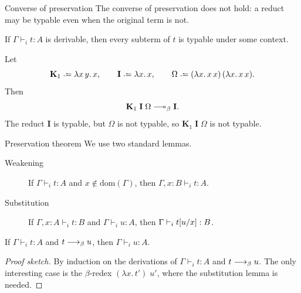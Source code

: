 \begin{frame}{Converse of preservation}
  The converse of preservation does not hold: a reduct may be typable even when
  the original term is not.

  \begin{lemma}
    If $\Gamma \vdash_i t : A$ is derivable, then every subterm of $t$ is
    typable under some context.
  \end{lemma}

  Let
  \[
    \mathbf{K}_1 \defeq \lambda x\,y.\,x,
    \qquad
    \mathbf{I} \defeq \lambda x.\,x,
    \qquad
    \Omega \defeq (\lambda x.\,x\,x)\,(\lambda x.\,x\,x).
  \]
  Then
  \[
    \mathbf{K}_1\;\mathbf{I}\;\Omega \reduce \mathbf{I}.
  \]
  The reduct $\mathbf{I}$ is typable, but $\Omega$ is not typable, so
  $\mathbf{K}_1\;\mathbf{I}\;\Omega$ is not typable.
\end{frame}

\begin{frame}{Preservation theorem}
  We use two standard lemmas.

  \begin{description}
    \item[Weakening]
      If $\Gamma \vdash_i t : A$ and $x \notin \mathrm{dom}(\Gamma)$, then
      $\Gamma, x : B \vdash_i t : A$.

    \item[Substitution]
      If $\Gamma, x : A \vdash_i t : B$ and $\Gamma \vdash_i u : A$, then
      $\Gamma \vdash_i t[{u}/{x}] : B$.
  \end{description}

  \begin{theorem}[Preservation]
    If $\Gamma \vdash_i t : A$ and $t \longrightarrow_{\beta} u$, then
    $\Gamma \vdash_i u : A$.
  \end{theorem}

  \begin{proof}[Proof sketch]
    By induction on the derivations of $\Gamma \vdash_i t : A$ and
    $t \longrightarrow_{\beta} u$.  The only interesting case is the $\beta$-redex
    $(\lambda x.\,t')\;u'$, where the substitution lemma is needed.
  \end{proof}
\end{frame}

